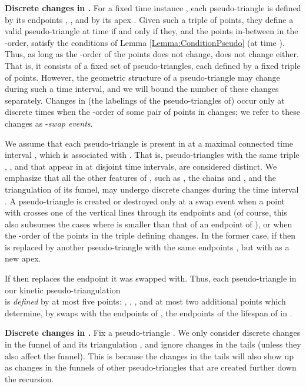\documentclass[11pt]{article}
\begin{document}
\medskip
\noindent
{\bf Discrete changes in .}
For a fixed time instance , each pseudo-triangle  is defined by its endpoints 
, , and by its apex . 
Given such a triple of points, they define a
valid pseudo-triangle at time  if and only if they, and the points
in-between in the -order, satisfy the conditions of Lemma
\ref{Lemma:ConditionPseudo} (at time ).  Thus, as long as the
-order of the points does not change,  does not change
either. That is, it consists of a fixed set of pseudo-triangles, each
defined by a fixed triple of points. However, the geometric structure of
a pseudo-triangle may change during such a time interval, and we will bound the number of these changes separately. Changes in (the labelings of the pseudo-triangles of)  occur only at discrete times when the
-order of some pair of points in  changes; we refer to these
changes as -\textit{swap events}.  

We assume that each
pseudo-triangle  is present in  at a maximal connected time
interval , which is associated with .  That is,
pseudo-triangles with the same triple , , and 
   that appear in  at
disjoint time intervals, are considered distinct.  We emphasize that
all the other features of , such as , the
chains  and , and the triangulation  of its funnel, may undergo discrete changes during
the time interval .  A pseudo-triangle  is created or
destroyed only at a swap event when a point  with
 crosses one of the vertical lines
through its endpoints  and  (of course, this also subsumes the cases where  is smaller than that of an endpoint of ), or when the
-order of the points in the triple defining  changes. In the
former case, if  then  is replaced
by another pseudo-triangle  with the same endpoints
,  but with 
as a new apex.

If  then 
replaces the endpoint it was swapped with.  Thus, each pseudo-triangle
 in our kinetic pseudo-triangulation\\  is
\textit{defined} by at most five points:
, , , and at most two additional
points which determine, by swaps with the endpoints of , the
endpoints of the lifespan  of  in .

\medskip
\noindent
{\bf Discrete changes in .}
Fix a pseudo-triangle . 
We only consider discrete changes in the funnel of  and its triangulation , and ignore changes in the tails  (unless they also affect the funnel). This is because the changes in the tails will also show up as changes in the funnels of other pseudo-triangles that are created further down the recursion.
\end{document}
